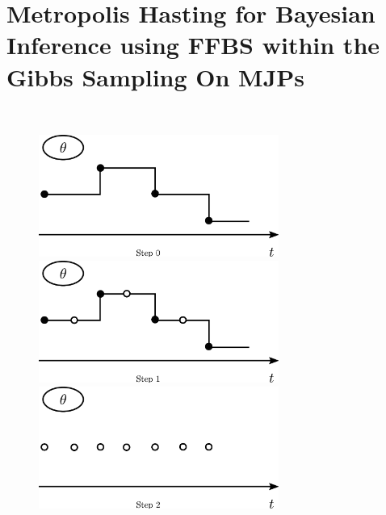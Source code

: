 \section{Metropolis Hasting for Bayesian Inference using FFBS  within the Gibbs Sampling On MJPs}~

\setlength{\unitlength}{0.8cm}
  \begin{figure}[H]
  \centering
  \begin{minipage}[!hp]{0.45\linewidth}
  \centering
    \includegraphics [width=0.70\textwidth, angle=0]{figs/plotn0.pdf}
      \end{minipage}
  \begin{minipage}[!hp]{0.45\linewidth}
  \centering
    \includegraphics [width=0.70\textwidth, angle=0]{figs/plotn1.pdf}
    \vspace{-0 in}
  \end{minipage}
  \begin{minipage}[!hp]{0.45\linewidth}
  \centering
    \includegraphics [width=0.70\textwidth, angle=0]{figs/plotn2.pdf}
    \vspace{-0 in}
  \end{minipage}

\end{figure}
